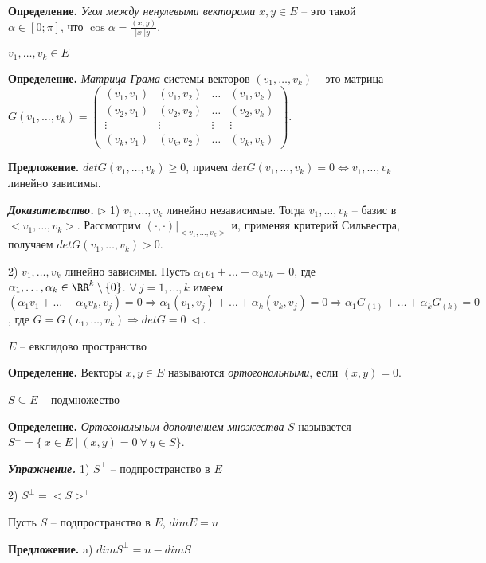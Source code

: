 \bigskip
\textbf{Определение.} \textit{Угол между ненулевыми векторами} $x, y \in E$ -- это такой $\alpha \in [0; \pi]$, что $\cos \alpha = \frac{(x,y)}{|x||y|}$.

\bigskip
$v_1, \dots, v_k \in E$

\textbf{Определение.} \textit{Матрица Грама} системы векторов $(v_1, \dots, v_k)$ -- это матрица $G(v_1, \dots, v_k) = \begin{pmatrix} (v_1, v_1) & (v_1, v_2) & \dots & (v_1, v_k) \\
(v_2, v_1) & (v_2, v_2) & \dots & (v_2, v_k) \\
\vdots & \vdots & \vdots & \vdots \\
(v_k, v_1) & (v_k, v_2) & \dots & (v_k, v_k) \end{pmatrix}$.

\bigskip
\textbf{Предложение.} $detG(v_1, \dots, v_k) \geq 0$, причем $detG(v_1, \dots, v_k) = 0 \Leftrightarrow v_1, \dots, v_k$ линейно зависимы.

\bigskip
\textbf{\textit{Доказательство.}} $\rhd$ 1) $v_1, \dots, v_k$ линейно независимые. Тогда $v_1, \dots, v_k$ -- базис в $<v_1, \dots, v_k>$. Рассмотрим $(\cdot, \cdot)|_{<v_1, \dots, v_k>}$ и, применяя критерий Сильвестра, получаем $detG(v_1, \dots, v_k) > 0$.

2) $v_1, \dots, v_k$ линейно зависимы. Пусть $\alpha_1 v_1 + \dots + \alpha_k v_k = 0$, где $\alpha_1, \dots, \alpha_k \in \RR^k \setminus \{0\}$. $\forall \ j = 1, \dots, k$ имеем $(\alpha_1 v_1 + \dots + \alpha_k v_k, v_j) = 0 \Rightarrow \alpha_1 (v_1, v_j) + \dots + \alpha_k (v_k, v_j) = 0 \Rightarrow \alpha_1 G_{(1)} + \dots + \alpha_k G_{(k)} = 0$, где $G = G(v_1, \dots, v_k) \Rightarrow detG = 0 \ \lhd$.

\bigskip
$E$ -- евклидово пространство

\textbf{Определение.} Векторы $x, y \in E$ называются \textit{ортогональными}, если $(x, y) = 0$.

\bigskip
$S \subseteq E$ -- подмножество

\textbf{Определение.} \textit{Ортогональным дополнением множества} $S$ называется $S^{\bot} = \{ \ x \in E \ | \ (x, y) = 0 \ \forall \ y \in S \}$.

\bigskip
\textbf{\textit{Упражнение.}} 1) $S^{\bot}$ -- подпространство в $E$

2) $S^{\bot} = <S>^{\bot}$

\bigskip
Пусть $S$ -- подпространство в $E$, $dimE = n$

\textbf{Предложение.} a) $dimS^{\bot} = n - dimS$

